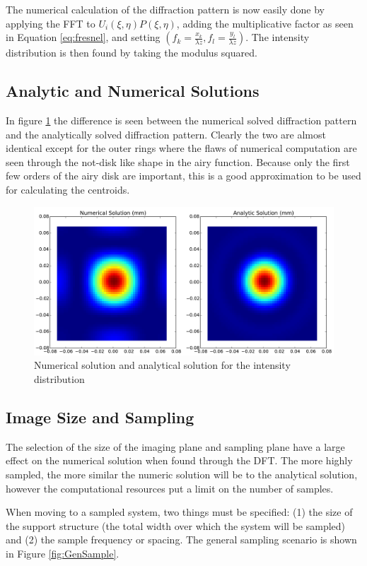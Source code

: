 The numerical calculation of the diffraction pattern is now easily done by applying the FFT to $U_i(\xi,\eta)P(\xi,\eta)$, adding the multiplicative factor as seen in Equation \eqref{eq:fresnel}, and setting $(f_k=\frac{x_k}{\lambda z},f_l=\frac{y_l}{\lambda z})$. The intensity distribution is then found by taking the modulus squared.

\subsection{Analytic and Numerical Solutions}
In figure \ref{fig:num_vs_an} the difference is seen between the numerical solved diffraction pattern and the analytically solved diffraction pattern. Clearly the two are almost identical except for the outer rings where the flaws of numerical computation are seen through the not-disk like shape in the airy function. Because only the first few orders of the airy disk are important, this is a good approximation to be used for calculating the centroids. 
\begin{figure}[H]
	\centering
		\includegraphics[width=1.0\textwidth]{figures/num_vs_an.pdf}
	\caption{Numerical solution and analytical solution for the intensity distribution}
	\label{fig:num_vs_an}
\end{figure}

\subsection{Image Size and Sampling}
The selection of the size of the imaging plane and sampling plane have a large effect on the numerical solution when found through the DFT.  The more highly sampled, the more similar the numeric solution will be to the analytical solution, however the computational resources put a limit on the number of samples. 

When moving to a sampled system, two things must be specified: (1) the size of the support structure (the total width over which the system will be sampled) and (2) the sample frequency or spacing.  The general sampling scenario is shown in Figure \ref{fig:GenSample}.  

